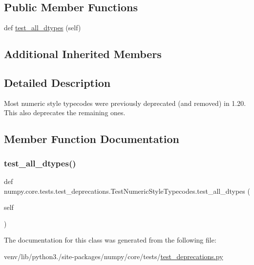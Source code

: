 \subsection*{Public Member Functions}
\begin{DoxyCompactItemize}
\item 
def \hyperlink{classnumpy_1_1core_1_1tests_1_1test__deprecations_1_1TestNumericStyleTypecodes_a4a3915686b97a5236449a7764284ec0b}{test\+\_\+all\+\_\+dtypes} (self)
\end{DoxyCompactItemize}
\subsection*{Additional Inherited Members}


\subsection{Detailed Description}
\begin{DoxyVerb}Most numeric style typecodes were previously deprecated (and removed)
in 1.20. This also deprecates the remaining ones.
\end{DoxyVerb}
 

\subsection{Member Function Documentation}
\mbox{\label{classnumpy_1_1core_1_1tests_1_1test__deprecations_1_1TestNumericStyleTypecodes_a4a3915686b97a5236449a7764284ec0b}} 
\subsubsection{\texorpdfstring{test\+\_\+all\+\_\+dtypes()}{test\_all\_dtypes()}}
{\footnotesize\ttfamily def numpy.\+core.\+tests.\+test\+\_\+deprecations.\+Test\+Numeric\+Style\+Typecodes.\+test\+\_\+all\+\_\+dtypes (\begin{DoxyParamCaption}\item[{}]{self }\end{DoxyParamCaption})}



The documentation for this class was generated from the following file\+:\begin{DoxyCompactItemize}
\item 
venv/lib/python3./site-\/packages/numpy/core/tests/\hyperlink{core_2tests_2test__deprecations_8py}{test\+\_\+deprecations.\+py}\end{DoxyCompactItemize}
